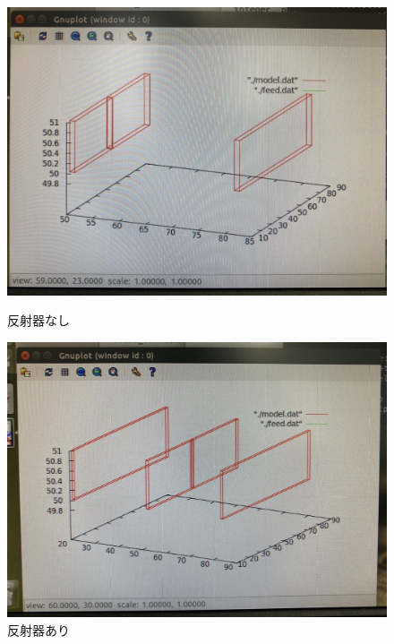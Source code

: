 \documentclass[dvipdfmx,autodetect-engine,titlepage]{jsarticle}
\begin{document}
\begin{figure}[H]
  \centering
  \begin{minipage}[b]{0.45\linewidth}
  \begin{center}
    \includegraphics[keepaspectratio,scale=0.13]{s1.jpg}
    \end{center}
    \caption{反射器なし}
  \end{minipage}
  \begin{minipage}[b]{0.45\linewidth}
  \begin{center}
    \includegraphics[keepaspectratio,scale=0.13]{s2.jpg}
    \end{center}
    \caption{反射器あり}
  \end{minipage}
\end{figure}
\end{document}
